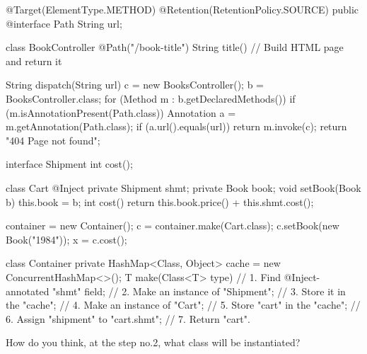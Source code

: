 \documentclass{article}
\begin{document}
\begin{pptWide}{2}
{\small\begin{ffcode}
@Target(ElementType.METHOD)
@Retention(RetentionPolicy.SOURCE)
public @interface Path
  String url;

class BookController
  @Path("/book-title")
  String title()
    // Build HTML page and return it
\end{ffcode}
}
\par\columnbreak\par
{\scriptsize\begin{ffcode}
String dispatch(String url) {
  c = new BooksController();
  b = BooksController.class;
  for (Method m : b.getDeclaredMethods()) {
    if (m.isAnnotationPresent(Path.class)) {
      Annotation a = m.getAnnotation(Path.class);
      if (a.url().equals(url)) {
        return m.invoke(c);
      }
    }
  }
  return "404 Page not found";
}
\end{ffcode}
}
\end{pptWide}
\par
\plush{}

\begin{pptWide}{2}
{\scriptsize\begin{ffcode}
interface Shipment
  int cost();

class Cart
  @Inject private Shipment shmt;
  private Book book;
  void setBook(Book b)
    this.book = b;
  int cost()
    return this.book.price() + this.shmt.cost();

container = new Container();
c = container.make(Cart.class);
c.setBook(new Book("1984"));
x = c.cost();
\end{ffcode}
}
\par\columnbreak\par
{\scriptsize\begin{ffcode}
class Container {
  private HashMap<Class, Object> cache =
    new ConcurrentHashMap<>();
  T make(Class<T> type) {
    // 1. Find @Inject-annotated "shmt" field;
    // 2. Make an instance of "Shipment";
    // 3. Store it in the "cache";
    // 4. Make an instance of "Cart";
    // 5. Store "cart" in the "cache";
    // 6. Assign "shipment" to "cart.shmt";
    // 7. Return "cart".
  }
}
\end{ffcode}
}
How do you think, at the step no.2,
what class will be instantiated?
\end{pptWide}
\par
\plush{}
\end{document}
